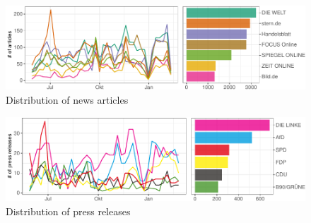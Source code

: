 \documentclass[
]{article}
\begin{document}
\begin{figure}

{\centering \includegraphics[width=0.7\linewidth]{main_text_files/figure-latex/Distribution of news articles-1} 

}

\caption{Distribution of news articles \label{fig:news_distr}}\label{fig:Distribution of news articles}
\end{figure}

\begin{figure}

{\centering \includegraphics[width=0.7\linewidth]{main_text_files/figure-latex/Distribution of press releases-1} 

}

\caption{Distribution of press releases \label{fig:press_distr}}\label{fig:Distribution of press releases}
\end{figure}
\end{document}
